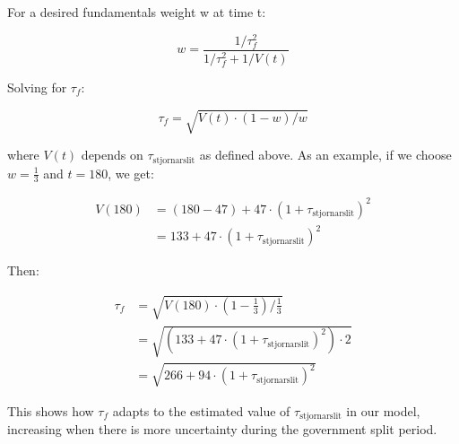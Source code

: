 \documentclass[
  letterpaper,
  DIV=11,
  numbers=noendperiod]{scrartcl}
\begin{document}
For a desired fundamentals weight w at time t:

\[
w = \frac{1/\tau_f^2}{1/\tau_f^2 + 1/V(t)}
\]

Solving for \(\tau_f\):

\[
\tau_f = \sqrt{V(t) \cdot (1-w)/w}
\]

where \(V(t)\) depends on \(\tau_{\text{stjornarslit}}\) as defined
above. As an example, if we choose \(w = \frac13\) and \(t = 180\), we
get:

\[
\begin{aligned}
V(180) &= (180 - 47) + 47 \cdot (1 + \tau_{\text{stjornarslit}})^2 \\
&= 133 + 47 \cdot (1 + \tau_{\text{stjornarslit}})^2
\end{aligned}
\]

Then:

\[
\begin{aligned}
\tau_f &= \sqrt{V(180) \cdot (1-\frac{1}{3})/\frac{1}{3}} \\
&= \sqrt{(133 + 47 \cdot (1 + \tau_{\text{stjornarslit}})^2) \cdot 2} \\
&= \sqrt{266 + 94 \cdot (1 + \tau_{\text{stjornarslit}})^2}
\end{aligned}
\]

This shows how \(\tau_f\) adapts to the estimated value of
\(\tau_{\text{stjornarslit}}\) in our model, increasing when there is
more uncertainty during the government split period.
\end{document}
